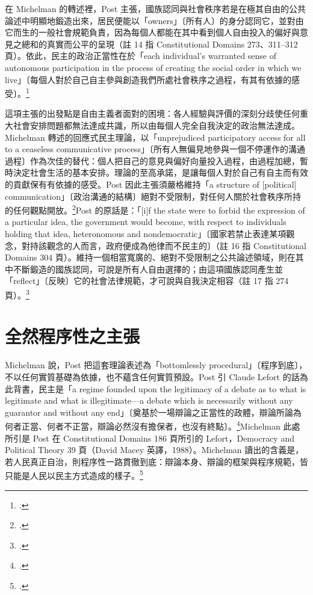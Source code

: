在 Michelman 的轉述裡，Post 主張，國族認同與社會秩序若是在極其自由的公共論述中明顯地鍛造出來，居民便能以「owners」〔所有人〕的身分認同它，並對由它而生的一般社會規範負責，因為每個人都能在其中看到個人自由投入的偏好與意見之總和的真實而公平的呈現（註 14 指 Constitutional Domains 273、311--312 頁）。依此，民主的政治正當性在於「each individual's warranted sense of autonomous participation in the process of creating the social order in which we live」〔每個人對於自己自主參與創造我們所處社會秩序之過程，有其有依據的感受〕。\footcite[404 n.14]{michelman1998}

這項主張的出發點是自由主義者面對的困境：各人經驗與評價的深刻分歧使任何重大社會安排問題都無法達成共識，所以由每個人完全自我決定的政治無法達成。Michelman 轉述的回應式民主理論，以「unprejudiced participatory access for all to a ceaseless communicative process」〔所有人無偏見地參與一個不停運作的溝通過程〕作為次佳的替代：個人把自己的意見與偏好向量投入過程，由過程加總，暫時決定社會生活的基本安排。理論的至高承諾，是讓每個人對於自己有自主而有效的貢獻保有有依據的感受。Post 因此主張須嚴格維持「a structure of [political] communication」〔政治溝通的結構〕絕對不受限制，對任何人關於社會秩序所持的任何觀點開放。\footcite[404 \& n.15]{michelman1998}Post 的原話是：「[i]f the state were to forbid the expression of a particular idea, the government would become, with respect to individuals holding that idea, heteronomous and nondemocratic」〔國家若禁止表達某項觀念，對持該觀念的人而言，政府便成為他律而不民主的〕（註 16 指 Constitutional Domains 304 頁）。維持一個相當寬廣的、絕對不受限制之公共論述領域，則在其中不斷鍛造的國族認同，可說是所有人自由選擇的；由這項國族認同產生並「reflect」〔反映〕它的社會法律規範，才可說與自我決定相容（註 17 指 274 頁）。\footcite[405 \& nn.16--17]{michelman1998}

\section{全然程序性之主張}
\label{sec:20_responsive-2}

Michelman 說，Post 把這套理論表述為「bottomlessly procedural」〔程序到底〕，不以任何實質基礎為依據，也不蘊含任何實質預設。Post 引 Claude Lefort 的話為此背書，民主是「a regime founded upon the legitimacy of a debate as to what is legitimate and what is illegitimate---a debate which is necessarily without any guarantor and without any end」〔奠基於一場辯論之正當性的政體，辯論所論為何者正當、何者不正當，辯論必然沒有擔保者，也沒有終點〕。\footcite[405 n.18]{michelman1998}Michelman 此處所引是 Post 在 Constitutional Domains 186 頁所引的 Lefort，Democracy and Political Theory 39 頁（David Macey 英譯，1988）。Michelman 讀出的含義是，若人民真正自治，則程序性一路貫徹到底：辯論本身、辯論的框架與程序規範，皆只能是人民以民主方式造成的樣子。\footcite[405]{michelman1998}

